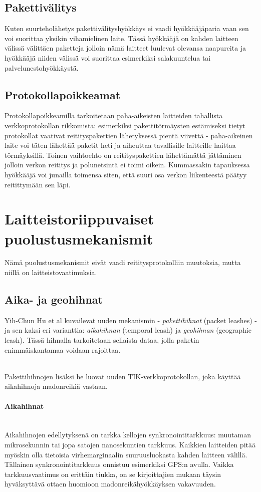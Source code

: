 \documentclass[finnish]{tktltiki2}
\theoremstyle{definition}
\theoremstyle{remark}
\begin{document}
\subsection{Pakettivälitys}

Kuten suurteholähetys pakettivälityshyökkäys ei vaadi hyökkääjäparia vaan sen voi suorittaa yksikin vihamielinen laite. Tässä hyökkääjä on kahden laitteen välissä välittäen paketteja jolloin nämä laitteet luulevat olevansa naapureita ja hyökkääjä niiden välissä voi suorittaa esimerkiksi salakuuntelua tai palvelunestohyökkäystä.


\subsection{Protokollapoikkeamat}

Protokollapoikkeamilla tarkoitetaan paha-aikeisten laitteiden tahallista verkkoprotokollan rikkomista: esimerkiksi pakettitörmäysten estämiseksi tietyt protokollat vaativat reitityspakettien lähetyksessä pientä viivettä - paha-aikeinen laite voi täten lähettää paketit heti ja aiheuttaa tavallisille laitteille haittaa törmäyksillä. Toinen vaihtoehto on reitityspakettien lähettämättä jättäminen jolloin verkon reititys ja polunetsintä ei toimi oikein. Kummassakin tapauksessa hyökkääjä voi junailla toimensa siten, että suuri osa verkon liikenteestä päätyy reitittymään sen läpi.

\section{Laitteistoriippuvaiset puolustusmekanismit}

Nämä puolustusmekanismit eivät vaadi reititysprotokolliin muutoksia, mutta niillä on laitteistovaatimuksia.

\subsection{Aika- ja geohihnat}
Yih-Chun Hu et al \cite{leashes} kuvailevat uuden mekanismin - \emph{pakettihihnat} (packet leashes) - ja sen kaksi eri varianttia: \emph{aikahihnan} (temporal leash) ja \emph{geohihnan} (geographic leash). Tässä hihnalla tarkoitetaan sellaista dataa, jolla paketin enimmäiskantamaa voidaan rajoittaa.

\noindent \\
Pakettihihnojen lisäksi he luovat uuden TIK-verkkoprotokollan, joka käyttää aikahihnoja madonreikiä vastaan.

\paragraph{Aikahihnat} 
\noindent \\
Aikahihnojen edellytyksenä on tarkka kellojen synkronointitarkkuus: muutaman mikrosekunnin tai jopa satojen nanosekuntien tarkkuus. Kaikkien laitteiden pitää myöskin olla tietoisia virhemarginaalin suuruusluokasta kahden laitteen välillä. Tällainen synkronointitarkkuus onnistuu esimerkiksi GPS:n avulla. Vaikka tarkkuusvaatimus on erittäin tiukka, on se kirjoittajien mukaan täysin hyväksyttävä ottaen huomioon madonreikähyökkäyksen vakavuuden.
\end{document}
